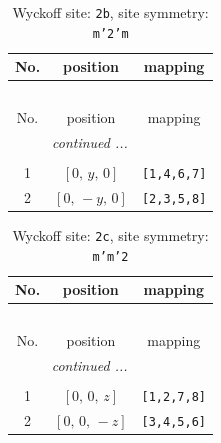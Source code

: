 \documentclass[fleqn,8pt]{jsarticle}
\begin{document}
\begin{longtable}{ccc}
\caption{Wyckoff site: {\tt 2b}, site symmetry: {\tt m'2'm}}
 \\
 \hline \hline
No. & position & mapping \\ \hline \endfirsthead

\multicolumn{2}{l}{\tablename\ \thetable{}} \\
 \hline \hline
No. & position & mapping \\ \hline \endhead

 \hline \hline
\multicolumn{2}{r}{\footnotesize\it continued ...} \\ \endfoot

 \hline \hline
\multicolumn{2}{r}{} \\ \endlastfoot

1 & $\left[ 0,\, y,\, 0 \right]$ & {\tt [1,4,6,7]} \\ \hline
2 & $\left[ 0,\, - y,\, 0 \right]$ & {\tt [2,3,5,8]} \\
\end{longtable}
\renewcommand{\arraystretch}{1.2}
\begin{longtable}{ccc}
\caption{Wyckoff site: {\tt 2c}, site symmetry: {\tt m'm'2}}
 \\
 \hline \hline
No. & position & mapping \\ \hline \endfirsthead

\multicolumn{2}{l}{\tablename\ \thetable{}} \\
 \hline \hline
No. & position & mapping \\ \hline \endhead

 \hline \hline
\multicolumn{2}{r}{\footnotesize\it continued ...} \\ \endfoot

 \hline \hline
\multicolumn{2}{r}{} \\ \endlastfoot

1 & $\left[ 0,\, 0,\, z \right]$ & {\tt [1,2,7,8]} \\ \hline
2 & $\left[ 0,\, 0,\, - z \right]$ & {\tt [3,4,5,6]} \\
\end{longtable}
\renewcommand{\arraystretch}{1.2}
\end{document}
